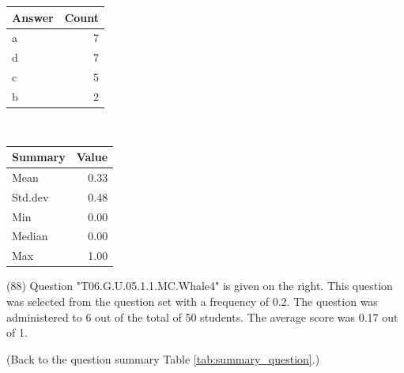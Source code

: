 \documentclass[12pt,english,nohyper]{tufte-handout}\usepackage[]{graphicx}\usepackage[]{color}
\begin{document}
\begin{center}%
\begin{tabular}{lr}
  \hline
Answer & Count \\ 
  \hline
a &   7 \\ 
  d &   7 \\ 
  c &   5 \\ 
  b &   2 \\ 
   \hline
\end{tabular}
~~~~~~~~%
\begin{tabular}{lr}
  \hline
Summary & Value \\ 
  \hline
Mean & 0.33 \\ 
  Std.dev & 0.48 \\ 
  Min & 0.00 \\ 
  Median & 0.00 \\ 
  Max & 1.00 \\ 
   \hline
\end{tabular}
\end{center}\newpage{} (88) Question "T06.G.U.05.1.1.MC.Whale4" is given on the right. This question was selected from the question set with a frequency of 0.2. The question was administered to 6 out of the total of 50 students. The average score was 0.17 out of 1.

 (Back to the question summary Table \ref{tab:summary_question}.)
\end{document}
